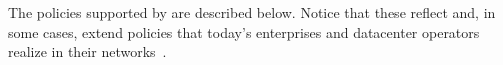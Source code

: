  The policies  supported by \Name are described
 below. Notice that these reflect and, in some cases, extend policies
 that today's enterprises and datacenter operators
 realize in their networks~\cite{mpa-imc15}.






